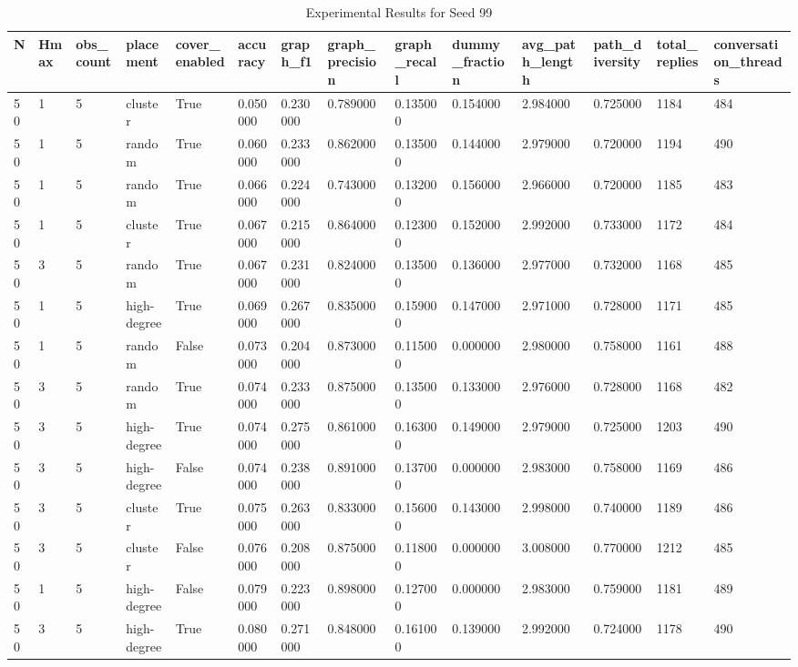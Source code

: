 \begin{table}
\caption{Experimental Results for Seed 99}
\label{tab:results_seed_99}
\begin{tabular}{llllllllllllll}
\toprule
N & Hmax & obs_count & placement & cover_enabled & accuracy & graph_f1 & graph_precision & graph_recall & dummy_fraction & avg_path_length & path_diversity & total_replies & conversation_threads \\
\midrule
50 & 1 & 5 & cluster & True & 0.050000 & 0.230000 & 0.789000 & 0.135000 & 0.154000 & 2.984000 & 0.725000 & 1184 & 484 \\
50 & 1 & 5 & random & True & 0.060000 & 0.233000 & 0.862000 & 0.135000 & 0.144000 & 2.979000 & 0.720000 & 1194 & 490 \\
50 & 1 & 5 & random & True & 0.066000 & 0.224000 & 0.743000 & 0.132000 & 0.156000 & 2.966000 & 0.720000 & 1185 & 483 \\
50 & 1 & 5 & cluster & True & 0.067000 & 0.215000 & 0.864000 & 0.123000 & 0.152000 & 2.992000 & 0.733000 & 1172 & 484 \\
50 & 3 & 5 & random & True & 0.067000 & 0.231000 & 0.824000 & 0.135000 & 0.136000 & 2.977000 & 0.732000 & 1168 & 485 \\
50 & 1 & 5 & high-degree & True & 0.069000 & 0.267000 & 0.835000 & 0.159000 & 0.147000 & 2.971000 & 0.728000 & 1171 & 485 \\
50 & 1 & 5 & random & False & 0.073000 & 0.204000 & 0.873000 & 0.115000 & 0.000000 & 2.980000 & 0.758000 & 1161 & 488 \\
50 & 3 & 5 & random & True & 0.074000 & 0.233000 & 0.875000 & 0.135000 & 0.133000 & 2.976000 & 0.728000 & 1168 & 482 \\
50 & 3 & 5 & high-degree & True & 0.074000 & 0.275000 & 0.861000 & 0.163000 & 0.149000 & 2.979000 & 0.725000 & 1203 & 490 \\
50 & 3 & 5 & high-degree & False & 0.074000 & 0.238000 & 0.891000 & 0.137000 & 0.000000 & 2.983000 & 0.758000 & 1169 & 486 \\
50 & 3 & 5 & cluster & True & 0.075000 & 0.263000 & 0.833000 & 0.156000 & 0.143000 & 2.998000 & 0.740000 & 1189 & 486 \\
50 & 3 & 5 & cluster & False & 0.076000 & 0.208000 & 0.875000 & 0.118000 & 0.000000 & 3.008000 & 0.770000 & 1212 & 485 \\
50 & 1 & 5 & high-degree & False & 0.079000 & 0.223000 & 0.898000 & 0.127000 & 0.000000 & 2.983000 & 0.759000 & 1181 & 489 \\
50 & 3 & 5 & high-degree & True & 0.080000 & 0.271000 & 0.848000 & 0.161000 & 0.139000 & 2.992000 & 0.724000 & 1178 & 490 \\

\end{tabular}
\end{table}
